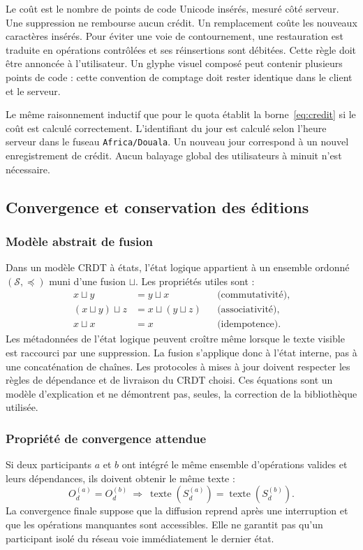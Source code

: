 Le coût est le nombre de points de code Unicode insérés, mesuré côté serveur. Une suppression ne rembourse aucun crédit. Un remplacement coûte les nouveaux caractères insérés. Pour éviter une voie de contournement, une restauration est traduite en opérations contrôlées et ses réinsertions sont débitées. Cette règle doit être annoncée à l'utilisateur. Un glyphe visuel composé peut contenir plusieurs points de code : cette convention de comptage doit rester identique dans le client et le serveur.

Le même raisonnement inductif que pour le quota établit la borne~\eqref{eq:credit} si le coût est calculé correctement. L'identifiant du jour est calculé selon l'heure serveur dans le fuseau \texttt{Africa/Douala}. Un nouveau jour correspond à un nouvel enregistrement de crédit. Aucun balayage global des utilisateurs à minuit n'est nécessaire.

\subsection{Convergence et conservation des éditions}
\subsubsection{Modèle abstrait de fusion}
Dans un modèle CRDT à états, l'état logique appartient à un ensemble ordonné $(\mathcal{S},\preceq)$ muni d'une fusion $\sqcup$. Les propriétés utiles sont :
\begin{align}
x\sqcup y &= y\sqcup x &&\text{(commutativité)},\\
(x\sqcup y)\sqcup z &= x\sqcup(y\sqcup z) &&\text{(associativité)},\\
x\sqcup x &= x &&\text{(idempotence)}.
\end{align}
Les métadonnées de l'état logique peuvent croître même lorsque le texte visible est raccourci par une suppression. La fusion s'applique donc à l'état interne, pas à une concaténation de chaînes. Les protocoles à mises à jour doivent respecter les règles de dépendance et de livraison du CRDT choisi. Ces équations sont un modèle d'explication et ne démontrent pas, seules, la correction de la bibliothèque utilisée.

\subsubsection{Propriété de convergence attendue}
Si deux participants $a$ et $b$ ont intégré le même ensemble d'opérations valides et leurs dépendances, ils doivent obtenir le même texte :
\begin{equation}
O_d^{(a)}=O_d^{(b)}\ \Longrightarrow\
\operatorname{texte}(S_d^{(a)})=\operatorname{texte}(S_d^{(b)}).
\end{equation}
La convergence finale suppose que la diffusion reprend après une interruption et que les opérations manquantes sont accessibles. Elle ne garantit pas qu'un participant isolé du réseau voie immédiatement le dernier état.


